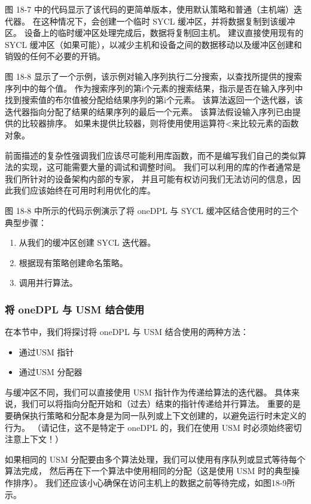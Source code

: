 图 18-7 中的代码显示了该代码的更简单版本，使用默认策略和普通（主机端）迭代器。 
在这种情况下，会创建一个临时 SYCL 缓冲区，并将数据复制到该缓冲区。 
设备上的临时缓冲区处理完成后，数据将复制回主机。 
建议直接使用现有的 SYCL 缓冲区（如果可能），以减少主机和设备之间的数据移动以及缓冲区创建和销毁的任何不必要的开销。

图 18-8 显示了一个示例，该示例对输入序列执行二分搜索，以查找所提供的搜索序列中的每个值。 
作为搜索序列的第i个元素的搜索结果，指示是否在输入序列中找到搜索值的布尔值被分配给结果序列的第i个元素。 
该算法返回一个迭代器，该迭代器指向分配了结果的结果序列的最后一个元素。 
该算法假设输入序列已由提供的比较器排序。 如果未提供比较器，则将使用使用运算符<来比较元素的函数对象。

前面描述的复杂性强调我们应该尽可能利用库函数，而不是编写我们自己的类似算法的实现，这可能需要大量的调试和调整时间。 
我们可以利用的库的作者通常是我们所针对的设备架构内部的专家，
并且可能有权访问我们无法访问的信息，因此我们应该始终在可用时利用优化的库。

图 18-8 中所示的代码示例演示了将 oneDPL 与 SYCL 缓冲区结合使用时的三个典型步骤：

\begin{enumerate}
	\item 从我们的缓冲区创建 SYCL 迭代器。

	\item 根据现有策略创建命名策略。

	\item 调用并行算法。
\end{enumerate}

\subsubsection{将 oneDPL 与 USM 结合使用}
在本节中，我们将探讨将 oneDPL 与 USM 结合使用的两种方法：

\begin{itemize}
	\item 通过USM 指针

	\item 通过USM 分配器
\end{itemize}

与缓冲区不同，我们可以直接使用 USM 指针作为传递给算法的迭代器。 
具体来说，我们可以将指向分配开始和（过去）结束的指针传递给并行算法。 
重要的是要确保执行策略和分配本身是为同一队列或上下文创建的，以避免运行时未定义的行为。 
（请记住，这不是特定于 oneDPL 的，我们在使用 USM 时必须始终密切注意上下文！）

如果相同的 USM 分配要由多个算法处理，我们可以使用有序队列或显式等待每个算法完成，
然后再在下一个算法中使用相同的分配（这是使用 USM 时的典型操作排序）。 
我们还应该小心确保在访问主机上的数据之前等待完成，如图18-9所示。

